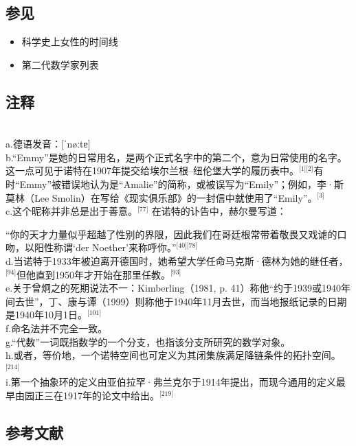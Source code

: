 \subsection{参见}
\begin{itemize}
\item 科学史上女性的时间线
\item 第二代数学家列表
\end{itemize}
\subsection{注释}\\
a.德语发音：[ˈnøːtɐ]\\
b.“Emmy”是她的日常用名，是两个正式名字中的第二个，意为日常使用的名字。这一点可见于诺特在1907年提交给埃尔兰根–纽伦堡大学的履历表中。\(^\text{[1][2]}\)有时“Emmy”被错误地认为是“Amalie”的简称，或被误写为“Emily”；例如，李·斯莫林（Lee Smolin）在写给《现实俱乐部》的一封信中就使用了“Emily”。\(^\text{[3]}\)\\
c.这个昵称并非总是出于善意。\(^\text{[77]}\)
  在诺特的讣告中，赫尔曼写道：

“你的天才力量似乎超越了性别的界限，因此我们在哥廷根常带着敬畏又戏谑的口吻，以阳性称谓‘der Noether’来称呼你。”\(^\text{[40][78]}\)\\
d.当诺特于1933年被迫离开德国时，她希望大学任命马克斯·德林为她的继任者，\(^\text{[94]}\)但他直到1950年才开始在那里任教。\(^\text{[93]}\)\\
e.关于曾炯之的死期说法不一：Kimberling（1981, p. 41）称他“约于1939或1940年间去世”，丁、康与谭（1999）则称他于1940年11月去世，而当地报纸记录的日期是1940年10月1日。\(^\text{[101]}\)\\
f.命名法并不完全一致。\\
g.“代数”一词既指数学的一个分支，也指该分支所研究的数学对象。\\
h.或者，等价地，一个诺特空间也可定义为其闭集族满足降链条件的拓扑空间。\(^\text{[214]}\)\\
i.第一个抽象环的定义由亚伯拉罕·弗兰克尔于1914年提出，而现今通用的定义最早由园正三在1917年的论文中给出。\(^\text{[219]}\)
\subsection{参考文献}

